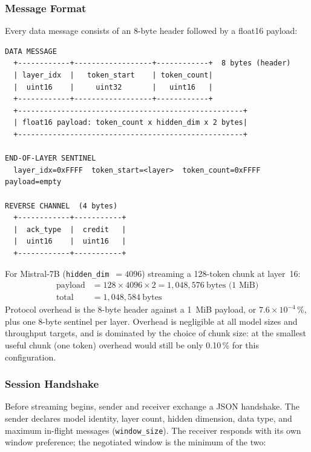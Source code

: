 \documentclass[11pt]{article}
\begin{document}
\subsubsection{Message Format}

Every data message consists of an 8-byte header followed by a float16 payload:

\begin{lstlisting}[style=asciiart, caption={Wire message formats. All integers are big-endian.}]
DATA MESSAGE
  +------------+------------------+------------+  8 bytes (header)
  | layer_idx  |   token_start    | token_count|
  |  uint16    |     uint32       |   uint16   |
  +------------+------------------+------------+
  +----------------------------------------------------+
  | float16 payload: token_count x hidden_dim x 2 bytes|
  +----------------------------------------------------+

END-OF-LAYER SENTINEL
  layer_idx=0xFFFF  token_start=<layer>  token_count=0xFFFF  payload=empty

REVERSE CHANNEL  (4 bytes)
  +------------+-----------+
  |  ack_type  |  credit   |
  |  uint16    |  uint16   |
  +------------+-----------+
\end{lstlisting}

For Mistral-7B (\texttt{hidden\_dim}~$= 4096$) streaming a 128-token chunk at layer~16:
\begin{align*}
  \text{payload} &= 128 \times 4096 \times 2 = 1{,}048{,}576\ \text{bytes (1~MiB)}\\
  \text{total}   &= 1{,}048{,}584\ \text{bytes}
\end{align*}
Protocol overhead is the 8-byte header against a 1~MiB payload, or $7.6 \times 10^{-4}$\,\%, plus one 8-byte sentinel per layer. Overhead is negligible at all model sizes and throughput targets, and is dominated by the choice of chunk size: at the smallest useful chunk (one token) overhead would still be only 0.10\,\% for this configuration.

\subsubsection{Session Handshake}

Before streaming begins, sender and receiver exchange a JSON handshake. The sender declares model identity, layer count, hidden dimension, data type, and maximum in-flight messages (\texttt{window\_size}). The receiver responds with its own window preference; the negotiated window is the minimum of the two:
\end{document}
